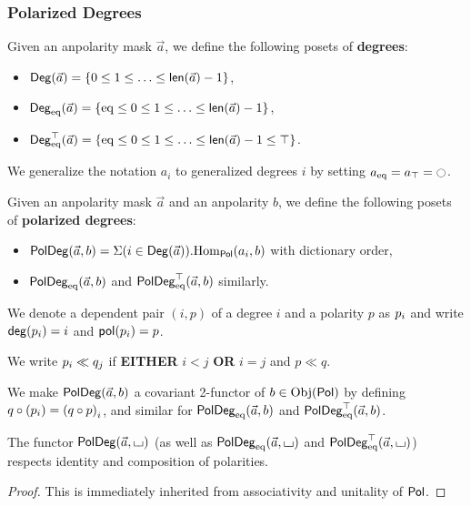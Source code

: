 \documentclass[a4paper]{memoir}
\begin{document}
\subsubsection{Polarized Degrees}
\begin{definition}
	Given an anpolarity mask $\vec a$, we define the following posets of \textbf{degrees}:
	\begin{itemize}
		\item $\Deg(\vec a) = \accol{0 \leq 1 \leq \ldots \leq \lenpol{\vec a} - 1}$,
		\item $\Degeq(\vec a) = \accol{\eqtydeg \leq 0 \leq 1 \leq \ldots \leq \lenpol{\vec a} - 1}$,
		\item $\Degeqtop(\vec a) = \accol{\eqtydeg \leq 0 \leq 1 \leq \ldots \leq \lenpol{\vec a} - 1 \leq \top}$.
	\end{itemize}
	We generalize the notation $a_i$ to generalized degrees $i$ by setting $a_\eqtydeg = a_\top = \npolar$.
\end{definition}
\begin{definition} \label{def:poldeg}
	Given an anpolarity mask $\vec a$ and an anpolarity $b$, we define the following posets of \textbf{polarized degrees}:
	\begin{itemize}
		\item $\poldeg(\vec a, b) = \Sigma(i \in \Deg(\vec a)).\Hom_\polcat(a_i, b)$ with dictionary order,
		\item $\poldegeq(\vec a, b)$ and $\poldegeqtop(\vec a, b)$ similarly.
	\end{itemize}
	We denote a dependent pair $(i, p)$ of a degree $i$ and a polarity $p$ as $\dpol i p$ and write $\getdeg(\dpol i p) = i$ and $\getpol(\dpol i p) = p$.
	
	We write $\dpol i p \ll \dpol j q$ if \textbf{EITHER} $i < j$ \textbf{OR} $i = j$ and $p \ll q$.
	
	We make $\poldeg(\vec a, b)$ a covariant 2-functor of $b \in \Obj(\polcat)$ by defining $q \circ (\dpol i p) = \dpol i {(q \circ p)}$, and similar for $\poldegeq(\vec a, b)$ and $\poldegeqtop(\vec a, b)$.
\end{definition}
\begin{corollary}
	The functor $\poldeg(\vec a, \loch)$ (as well as $\poldegeq(\vec a, \loch)$ and $\poldegeqtop(\vec a, \loch)$) respects identity and composition of polarities.
\end{corollary}
\begin{proof}
	This is immediately inherited from associativity and unitality of $\polcat$.
\end{proof}
\end{document}
